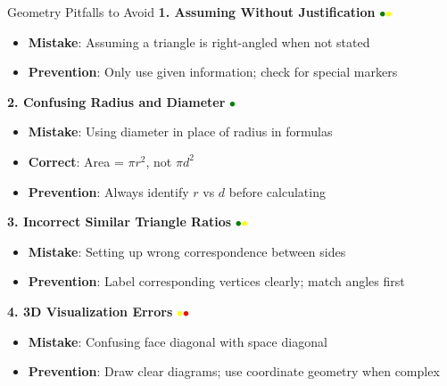 \documentclass{article}
\begin{document}
\begin{trapbox}{Geometry Pitfalls to Avoid}
\textbf{1. Assuming Without Justification} \textcolor{green}{$\bullet$}\textcolor{yellow}{$\bullet$}
\begin{itemize}[nosep]
\item \textbf{Mistake}: Assuming a triangle is right-angled when not stated
\item \textbf{Prevention}: Only use given information; check for special markers
\end{itemize}

\textbf{2. Confusing Radius and Diameter} \textcolor{green}{$\bullet$}
\begin{itemize}[nosep]
\item \textbf{Mistake}: Using diameter in place of radius in formulas
\item \textbf{Correct}: Area = $\pi r^2$, not $\pi d^2$
\item \textbf{Prevention}: Always identify $r$ vs $d$ before calculating
\end{itemize}

\textbf{3. Incorrect Similar Triangle Ratios} \textcolor{green}{$\bullet$}\textcolor{yellow}{$\bullet$}
\begin{itemize}[nosep]
\item \textbf{Mistake}: Setting up wrong correspondence between sides
\item \textbf{Prevention}: Label corresponding vertices clearly; match angles first
\end{itemize}

\textbf{4. 3D Visualization Errors} \textcolor{yellow}{$\bullet$}\textcolor{red}{$\bullet$}
\begin{itemize}[nosep]
\item \textbf{Mistake}: Confusing face diagonal with space diagonal
\item \textbf{Prevention}: Draw clear diagrams; use coordinate geometry when complex
\end{itemize}


\end{trapbox}
\end{document}
